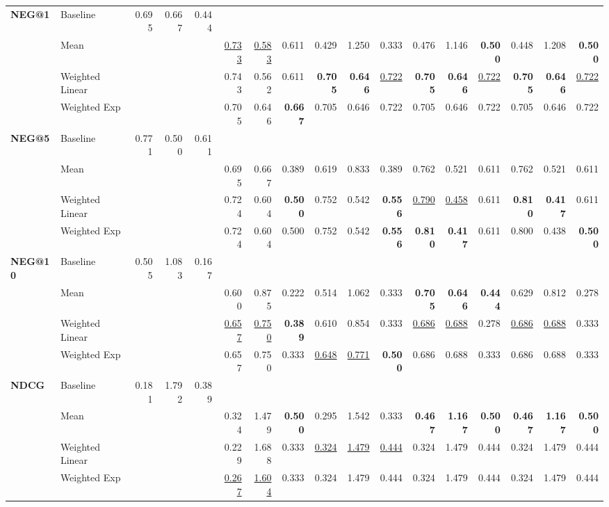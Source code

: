 \documentclass{article}
\begin{document}
\begin{table}[htbp]
\begin{tabular}{@{}llrrr|rrr|rrr|rrr|rrr@{}}
\multirow{4}{*}{\textbf{NEG@1}} 
& Baseline & 0.695 & 0.667 & 0.444 & & & & & & & & & & & & \\
& Mean & & & & \uline{0.733} & \uline{0.583} & 0.611 & 0.429 & 1.250 & 0.333 & 0.476 & 1.146 & \textbf{0.500} & 0.448 & 1.208 & \textbf{0.500} \\
& Weighted Linear & & & & 0.743 & 0.562 & 0.611 & \textbf{0.705} & \textbf{0.646} & \uline{0.722} & \textbf{0.705} & \textbf{0.646} & \uline{0.722} & \textbf{0.705} & \textbf{0.646} & \uline{0.722} \\
& Weighted Exp & & & & 0.705 & 0.646 & \textbf{0.667} & 0.705 & 0.646 & 0.722 & 0.705 & 0.646 & 0.722 & 0.705 & 0.646 & 0.722 \\
\midrule

\multirow{4}{*}{\textbf{NEG@5}} 
& Baseline & 0.771 & 0.500 & 0.611 & & & & & & & & & & & & \\
& Mean & & & & 0.695 & 0.667 & 0.389 & 0.619 & 0.833 & 0.389 & 0.762 & 0.521 & 0.611 & 0.762 & 0.521 & 0.611 \\
& Weighted Linear & & & & 0.724 & 0.604 & \textbf{0.500} & 0.752 & 0.542 & \textbf{0.556} & \uline{0.790} & \uline{0.458} & 0.611 & \textbf{0.810} & \textbf{0.417} & 0.611 \\
& Weighted Exp & & & & 0.724 & 0.604 & 0.500 & 0.752 & 0.542 & \textbf{0.556} & \textbf{0.810} & \textbf{0.417} & 0.611 & 0.800 & 0.438 & \textbf{0.500} \\
\midrule

\multirow{4}{*}{\textbf{NEG@10}} 
& Baseline & 0.505 & 1.083 & 0.167 & & & & & & & & & & & & \\
& Mean & & & & 0.600 & 0.875 & 0.222 & 0.514 & 1.062 & 0.333 & \textbf{0.705} & \textbf{0.646} & \textbf{0.444} & 0.629 & 0.812 & 0.278 \\
& Weighted Linear & & & & \uline{0.657} & \uline{0.750} & \textbf{0.389} & 0.610 & 0.854 & 0.333 & \uline{0.686} & \uline{0.688} & 0.278 & \uline{0.686} & \uline{0.688} & 0.333 \\
& Weighted Exp & & & & 0.657 & 0.750 & 0.333 & \uline{0.648} & \uline{0.771} & \textbf{0.500} & 0.686 & 0.688 & 0.333 & 0.686 & 0.688 & 0.333 \\
\midrule

\multirow{4}{*}{\textbf{NDCG}} 
& Baseline & 0.181 & 1.792 & 0.389 & & & & & & & & & & & & \\
& Mean & & & & 0.324 & 1.479 & \textbf{0.500} & 0.295 & 1.542 & 0.333 & \textbf{0.467} & \textbf{1.167} & \textbf{0.500} & \textbf{0.467} & \textbf{1.167} & \textbf{0.500} \\
& Weighted Linear & & & & 0.229 & 1.688 & 0.333 & \uline{0.324} & \uline{1.479} & \uline{0.444} & 0.324 & 1.479 & 0.444 & 0.324 & 1.479 & 0.444 \\
& Weighted Exp & & & & \uline{0.267} & \uline{1.604} & 0.333 & 0.324 & 1.479 & 0.444 & 0.324 & 1.479 & 0.444 & 0.324 & 1.479 & 0.444 \\
\midrule


\end{tabular}
\end{table}
\end{document}
